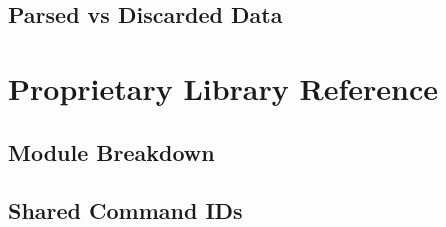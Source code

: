 \documentclass[11pt,letterpaper]{article}
\begin{document}

\subsection{Parsed vs Discarded Data}
\label{subsec:telemetry-parsed}



\newpage
\section{Proprietary Library Reference}
\label{sec:proprietary-lib}

\subsection{Module Breakdown}
\label{subsec:lib-modules}


\subsection{Shared Command IDs}
\label{subsec:lib-shared-ids}

\end{document}
